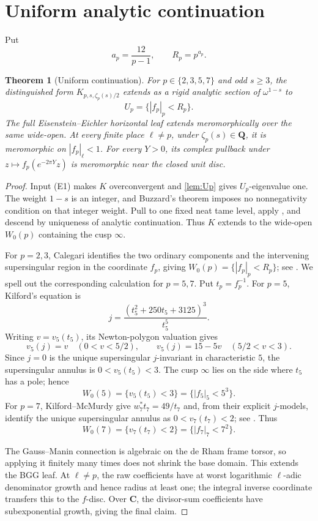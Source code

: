 \documentclass[11pt]{article}
\newtheorem{theorem}{Theorem}[section]
\theoremstyle{definition}
\theoremstyle{remark}
\newcommand{\Q}{\mathbf Q}
\newcommand{\C}{\mathbf C}
\newcommand{\abs}[1]{\left|#1\right|}
\begin{document}
\section{Uniform analytic continuation}\label{sec:continuation}

Put
\[
 a_p=\frac{12}{p-1},
 \qquad
 R_p=p^{a_p}.
\]

\begin{theorem}[Uniform continuation]\label{thm:continuation}
For $p\in\{2,3,5,7\}$ and odd $s\ge3$, the distinguished form
$K_{p,s,\zeta_p(s)/2}$ extends as a rigid analytic section of
$\omega^{1-s}$ to
\[
 U_p=\{\abs{f_p}_p<R_p\}.
\]
The full Eisenstein--Eichler horizontal leaf extends meromorphically over the
same wide-open.  At every finite place $\ell\ne p$, under
$\zeta_p(s)\in\Q$, it is meromorphic on $\abs{f_p}_\ell<1$.  For every
$Y>0$, its complex pullback under $z\mapsto f_p(e^{-2\pi Y}z)$ is
meromorphic near the closed unit disc.
\end{theorem}

\begin{proof}
Input (E1) makes $K$ overconvergent and \cref{lem:Up} gives $U_p$-eigenvalue
one.  The weight $1-s$ is an integer, and Buzzard's theorem imposes no
nonnegativity condition on that integer weight.  Pull to one fixed neat tame
level, apply \cite[Theorem~5.2(2)]{Buzzard2003}, and descend by uniqueness of
analytic continuation.  Thus $K$ extends to the wide-open $W_0(p)$ containing the
cusp $\infty$.

For $p=2,3$, Calegari identifies the two ordinary components and the
intervening supersingular region in the coordinate $f_p$, giving
$W_0(p)=\{\abs{f_p}_p<R_p\}$; see \cite[Section~3]{Calegari2005}.  We spell
out the corresponding calculation for $p=5,7$.  Put $t_p=f_p^{-1}$.
For $p=5$, Kilford's equation \cite[(3)]{Kilford2008} is
\[
 j=\frac{(t_5^2+250t_5+3125)^3}{t_5^5}.
\]
Writing $v=v_5(t_5)$, its Newton-polygon valuation gives
\[
 v_5(j)=v\quad(0<v<5/2),
 \qquad
 v_5(j)=15-5v\quad(5/2<v<3).
\]
Since $j=0$ is the unique supersingular $j$-invariant in characteristic $5$,
the supersingular annulus is $0<v_5(t_5)<3$.  The cusp $\infty$ lies on the
side where $t_5$ has a pole; hence
\[
 W_0(5)=\{v_5(t_5)<3\}=\{\abs{f_5}_5<5^3\}.
\]
For $p=7$, Kilford--McMurdy give $w_7^*t_7=49/t_7$ and, from their explicit
$j$-models, identify the unique supersingular annulus as
$0<v_7(t_7)<2$; see \cite[Equations~(1)--(4) and Section~2]{KilfordMcMurdy2012}.
Thus
\[
 W_0(7)=\{v_7(t_7)<2\}=\{\abs{f_7}_7<7^2\}.
\]

The Gauss--Manin connection is algebraic on the de Rham frame torsor, so
applying it finitely many times does not shrink the base domain.  This extends
the BGG leaf.  At $\ell\ne p$, the raw coefficients have at worst logarithmic
$\ell$-adic denominator growth and hence radius at least one; the integral
inverse coordinate transfers this to the $f$-disc.  Over $\C$, the divisor-sum
coefficients have subexponential growth, giving the final claim.
\end{proof}
\end{document}

